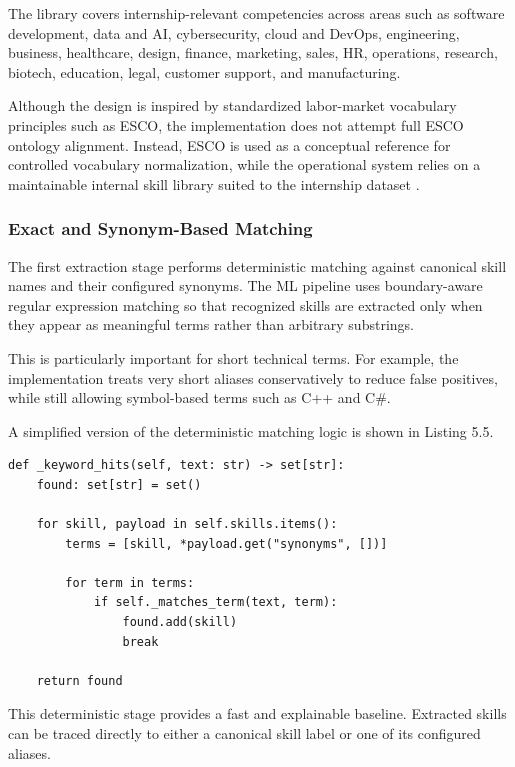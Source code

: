 The library covers internship-relevant competencies across areas such as software development, data and AI, cybersecurity, cloud and DevOps, engineering, business, healthcare, design, finance, marketing, sales, HR, operations, research, biotech, education, legal, customer support, and manufacturing.

Although the design is inspired by standardized labor-market vocabulary principles such as ESCO, the implementation does not attempt full ESCO ontology alignment. Instead, ESCO is used as a conceptual reference for controlled vocabulary normalization, while the operational system relies on a maintainable internal skill library suited to the internship dataset \cite{esco2024}.

\subsubsection*{Exact and Synonym-Based Matching}

The first extraction stage performs deterministic matching against canonical skill names and their configured synonyms. The ML pipeline uses boundary-aware regular expression matching so that recognized skills are extracted only when they appear as meaningful terms rather than arbitrary substrings.

This is particularly important for short technical terms. For example, the implementation treats very short aliases conservatively to reduce false positives, while still allowing symbol-based terms such as C++ and C\#.

A simplified version of the deterministic matching logic is shown in Listing 5.5.

\begin{lstlisting}[caption={Simplified exact and synonym-based skill matching}]
def _keyword_hits(self, text: str) -> set[str]:
    found: set[str] = set()

    for skill, payload in self.skills.items():
        terms = [skill, *payload.get("synonyms", [])]

        for term in terms:
            if self._matches_term(text, term):
                found.add(skill)
                break

    return found
\end{lstlisting}

This deterministic stage provides a fast and explainable baseline. Extracted skills can be traced directly to either a canonical skill label or one of its configured aliases.

